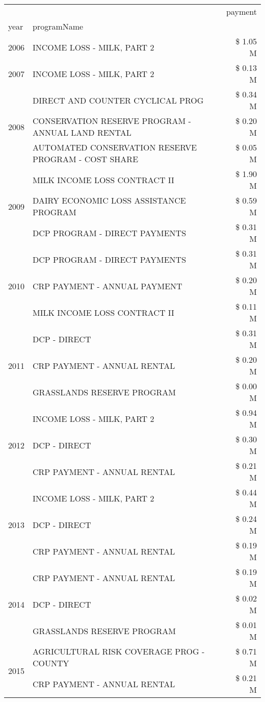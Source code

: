 \begin{tabular}{llr}
\toprule
 &  & payment \\
year & programName &  \\
\midrule
2006 & INCOME LOSS - MILK, PART 2 & \$ 1.05 M \\
\cline{1-3}
2007 & INCOME LOSS - MILK, PART 2 & \$ 0.13 M \\
\cline{1-3}
\multirow[t]{3}{*}{2008} & DIRECT AND COUNTER CYCLICAL PROG & \$ 0.34 M \\
 & CONSERVATION RESERVE PROGRAM - ANNUAL LAND RENTAL & \$ 0.20 M \\
 & AUTOMATED CONSERVATION RESERVE PROGRAM - COST SHARE & \$ 0.05 M \\
\cline{1-3}
\multirow[t]{3}{*}{2009} & MILK INCOME LOSS CONTRACT II & \$ 1.90 M \\
 & DAIRY ECONOMIC LOSS ASSISTANCE PROGRAM & \$ 0.59 M \\
 & DCP PROGRAM - DIRECT PAYMENTS & \$ 0.31 M \\
\cline{1-3}
\multirow[t]{3}{*}{2010} & DCP PROGRAM - DIRECT PAYMENTS & \$ 0.31 M \\
 & CRP PAYMENT - ANNUAL PAYMENT & \$ 0.20 M \\
 & MILK INCOME LOSS CONTRACT II & \$ 0.11 M \\
\cline{1-3}
\multirow[t]{3}{*}{2011} & DCP - DIRECT & \$ 0.31 M \\
 & CRP PAYMENT - ANNUAL RENTAL & \$ 0.20 M \\
 & GRASSLANDS RESERVE PROGRAM & \$ 0.00 M \\
\cline{1-3}
\multirow[t]{3}{*}{2012} & INCOME LOSS - MILK, PART 2 & \$ 0.94 M \\
 & DCP - DIRECT & \$ 0.30 M \\
 & CRP PAYMENT - ANNUAL RENTAL & \$ 0.21 M \\
\cline{1-3}
\multirow[t]{3}{*}{2013} & INCOME LOSS - MILK, PART 2 & \$ 0.44 M \\
 & DCP - DIRECT & \$ 0.24 M \\
 & CRP PAYMENT - ANNUAL RENTAL & \$ 0.19 M \\
\cline{1-3}
\multirow[t]{3}{*}{2014} & CRP PAYMENT - ANNUAL RENTAL & \$ 0.19 M \\
 & DCP - DIRECT & \$ 0.02 M \\
 & GRASSLANDS RESERVE PROGRAM & \$ 0.01 M \\
\cline{1-3}
\multirow[t]{3}{*}{2015} & AGRICULTURAL RISK COVERAGE PROG - COUNTY & \$ 0.71 M \\
 & CRP PAYMENT - ANNUAL RENTAL & \$ 0.21 M \\

\end{tabular}
